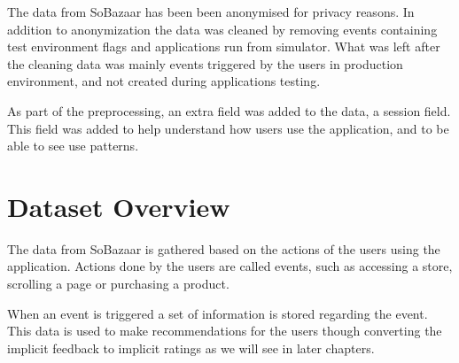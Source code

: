     The data from SoBazaar has been been anonymised for privacy reasons.
    In addition to anonymization the data was cleaned by removing events containing test environment flags and applications run from simulator.
    What was left after the cleaning data was mainly events triggered by the users in production environment, and not created during applications testing.

    As part of the preprocessing, an extra field was added to the data, a session field.
    This field was added to help understand how users use the application, and to be able to see use patterns.

\section{Dataset Overview}
    The data from SoBazaar is gathered based on the actions of the users using the application.
    Actions done by the users are called events, such as accessing a store, scrolling a page or purchasing a product.

    When an event is triggered a set of information is stored regarding the event.
    This data is used to make recommendations for the users though converting the implicit feedback to implicit ratings as we will see in later chapters.

